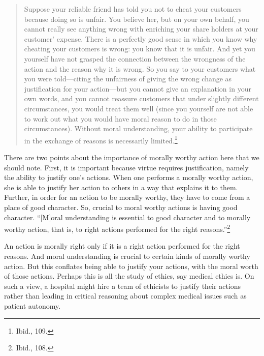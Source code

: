 \documentclass[phdthesis,12pt,final]{wuthesis}
\theoremstyle{definition}
\theoremstyle{definition}
\theoremstyle{definition}
\theoremstyle{definition}
\theoremstyle{remark}
\begin{document}
\begin{quote}
Suppose your reliable friend has told you not to cheat your customers because doing so is unfair. You believe her, but on your own behalf, you cannot really see anything wrong with enriching your share holders at your customer' expense. There is a perfectly good sense in which you know why cheating your customers is wrong: you know that it is unfair. And yet you yourself have not grasped the connection between the wrongness of the action and the reason why it is wrong. So you say to your customers what you were told---citing the unfairness of giving the wrong change as justification for your action---but you cannot give an explanation in your own words, and you cannot reassure customers that under slightly different circumstances, you would treat them well (since you yourself are not able to work out what you would have moral reason to do in those circumstances). Without moral understanding, your ability to participate in the exchange of reasons is necessarily limited.\footnote{Ibid., 109.}
\end{quote}

There are two points about the importance of morally worthy action here that we should note. First, it is important because virtue requires justification, namely the ability to justify one's actions. When one performs a morally worthy action, she is able to justify her action to others in a way that explains it to them. Further, in order for an action to be morally worthy, they have to come from a place of good character. So, crucial to moral worthy actions is having good character. ``{[}M{]}oral understanding is essential to good character and to morally worthy action, that is, to right actions performed for the right reasons.''\footnote{Ibid., 108.}

\begin{Shaded}
\begin{Highlighting}[]

\end{Highlighting}
\end{Shaded}

An action is morally right only if it is a right action performed for the right reasons. And moral understanding is crucial to certain kinds of morally worthy action. But this conflates being able to justify your actions, with the moral worth of those actions. Perhaps this is all the study of ethics, say medical ethics is. On such a view, a hospital might hire a team of ethicists to justify their actions rather than leading in critical reasoning about complex medical issues such as patient autonomy.
\end{document}
